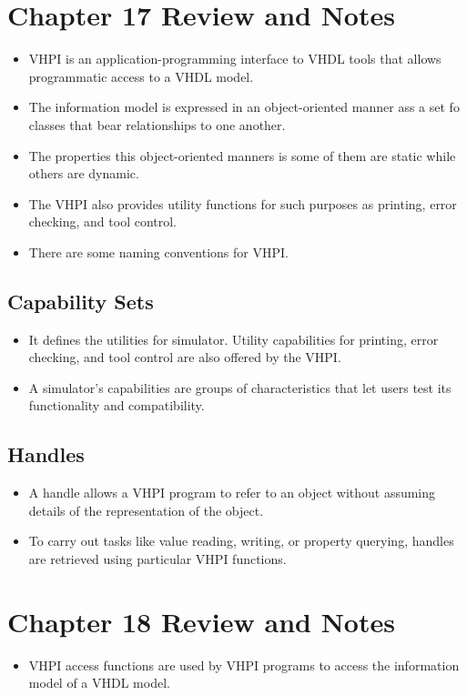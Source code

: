 \documentclass[a4paper,12pt]{article}
\begin{document}
	\section*{Chapter 17 Review and Notes}
	\begin{itemize}
		\item VHPI is an application-programming interface to VHDL tools that allows programmatic access to a VHDL model.
		\item The information model is expressed in an object-oriented manner ass a set fo classes that bear relationships to one another.
		\item The properties this object-oriented manners is some of them are static while others are dynamic.
		\item The VHPI also provides utility functions for such purposes as printing, error checking, and tool control.
		\item There are some naming conventions for VHPI.
	\end{itemize}
	
	\subsection*{Capability Sets}
	\begin{itemize}
		\item It defines the utilities for simulator. Utility capabilities for printing, error checking, and tool control are also offered by the VHPI.
		\item A simulator's capabilities are groups of characteristics that let users test its functionality and compatibility.
	\end{itemize}
	
	\subsection*{Handles}
	\begin{itemize}
		\item A handle allows a VHPI program to refer to an object without assuming details of the representation of the object.
		\item To carry out tasks like value reading, writing, or property querying, handles are retrieved using particular VHPI functions. 
	\end{itemize}
	
	\section*{Chapter 18 Review and Notes}
	\begin{itemize}
		\item VHPI access functions are used by VHPI programs to access the information model of a VHDL model.
	\end{itemize}
	
	
	
\end{document}
